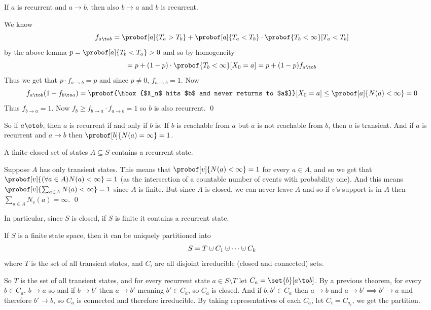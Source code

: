     If $a$ is recurrent and $a\to b$, then also $b\to a$ and $b$ is recurrent.

\ethrm

We know
$$ f_{a\to b} = \probof[a]{T_a>T_b} + \probof[a]{T_a<T_b}\cdot\probof{T_b<\infty}[T_a<T_b] $$
by the above lemma $p=\probof[a]{T_b<T_a}>0$ and so by homogeneity
$$ = p + (1-p)\cdot\probof{T_b<\infty}[X_0=a] = p + (1-p)f_{a\to b} $$
Thus we get that $p\cdot f_{a\to b}=p$ and since $p\neq0$, $f_{a\to b}=1$.
Now
$$ f_{a\to b}(1-f_{b\to a}) = \probof{\hbox{$X_n$ hits $b$ and never returns to $a$}}[X_0=a] \leq \probof[a]{N(a)<\infty} = 0 $$
Thus $f_{b\to a}=1$.
Now $f_b\geq f_{b\to a}\cdot f_{a\to b}=1$ so $b$ is also recurrent.
\qed

So if $a\oto b$, then $a$ is recurrent if and only if $b$ is.
If $b$ is reachable from $a$ but $a$ is not reachable from $b$, then $a$ is transient.
And if $a$ is recurrent and $a\to b$ then $\probof[b]{N(a)=\infty}=1$.

\bthrm

    A finite closed set of states $A\subseteq S$ contains a recurrent state.

\ethrm

Suppose $A$ has only transient states.
This means that $\probof[v]{N(a)<\infty}=1$ for every $a\in A$, and so we get that $\probof[v]{(\forall a\in A)N(a)<\infty}=1$ (as the intersection of a countable number of events with probability one).
And this means $\probof[v]{\sum_{a\in A}N(a)<\infty}=1$ since $A$ is finite.
But since $A$ is closed, we can never leave $A$ and so if $v$'s support is in $A$ then $\sum_{a\in A}N_v(a)=\infty$.
\qed

In particular, since $S$ is closed, if $S$ is finite it contains a recurrent state.

\bthrm

    If $S$ is a finite state space, then it can be uniquely partitioned into
    $$ S = T\dcup C_1\dcup\cdots\dcup C_k $$
    where $T$ is the set of all transient states, and $C_i$ are all disjoint irreducible (closed and connected) sets.

\ethrm

So $T$ is the set of all transient states, and for every recurrent state $a\in S\setminus T$ let $C_a=\set{b}[a\to b]$.
By a previous theorem, for every $b\in C_a$, $b\to a$ so and if $b\to b'$ then $a\to b'$ meaning $b'\in C_a$, so $C_a$ is closed.
And if $b,b'\in C_a$ then $a\to b$ and $a\to b'\implies b'\to a$ and therefore $b'\to b$, so $C_a$ is connected and therefore irreducible.
By taking representatives of each $C_a$, let $C_i=C_{a_i}$, we get the partition.

